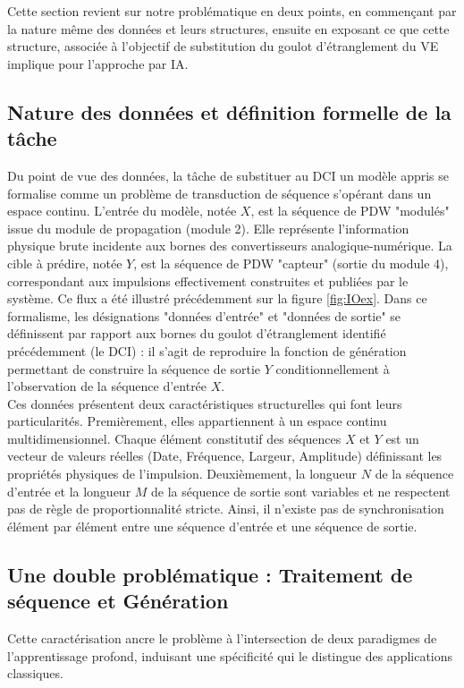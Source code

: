 Cette section revient sur notre problématique en deux points, en commençant par la nature même des données et leurs structures, ensuite en exposant ce que cette structure, associée à l'objectif de substitution du goulot d'étranglement du VE implique pour l'approche par IA.

\subsection{Nature des données et définition formelle de la tâche}
Du point de vue des données, la tâche de substituer au DCI un modèle appris se formalise comme un problème de transduction de séquence s'opérant dans un espace continu. L'entrée du modèle, notée $X$, est la séquence de PDW "modulés" issue du module de propagation (module 2). Elle représente l'information physique brute incidente aux bornes des convertisseurs analogique-numérique. La cible à prédire, notée $Y$, est la séquence de PDW "capteur" (sortie du module 4), correspondant aux impulsions effectivement construites et publiées par le système. Ce flux a été illustré précédemment sur la figure \ref{fig:IOex}. Dans ce formalisme, les désignations "données d'entrée" et "données de sortie" se définissent par rapport aux bornes du goulot d'étranglement identifié précédemment (le DCI) : il s'agit de reproduire la fonction de génération permettant de construire la séquence de sortie $Y$ conditionnellement à l'observation de la séquence d'entrée $X$.\\

Ces données présentent deux caractéristiques structurelles qui font leurs particularités. Premièrement, elles appartiennent à un espace continu multidimensionnel. Chaque élément constitutif des séquences $X$ et $Y$ est un vecteur de valeurs réelles (Date, Fréquence, Largeur, Amplitude) définissant les propriétés physiques de l'impulsion. Deuxièmement, la longueur $N$ de la séquence d'entrée et la longueur $M$ de la séquence de sortie sont variables et ne respectent pas de règle de proportionnalité stricte. Ainsi, il n'existe pas de synchronisation élément par élément entre une séquence d'entrée et une séquence de sortie.

\subsection{Une double problématique : Traitement de séquence et Génération}
Cette caractérisation ancre le problème à l'intersection de deux paradigmes de l'apprentissage profond, induisant une spécificité qui le distingue des applications classiques. \\

